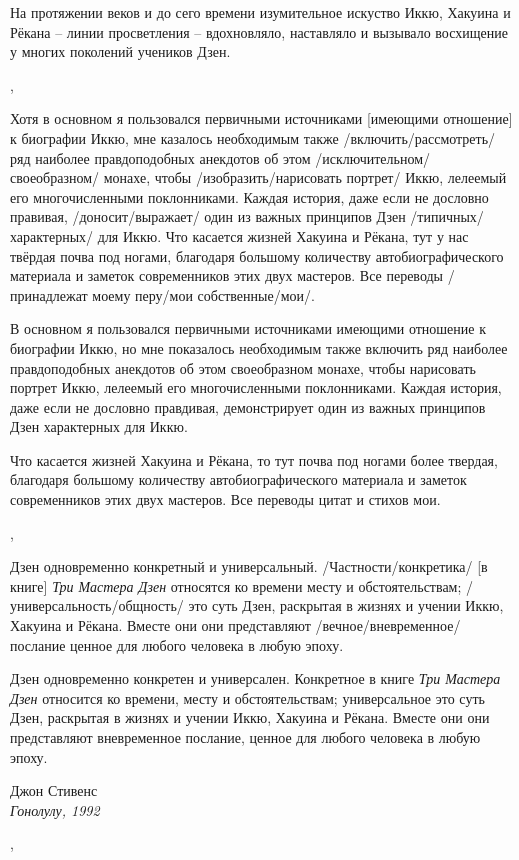 \begin{ver}[1]
На протяжении веков и до сего времени изумительное искуство Иккю,
Хакуина и Рёкана -- линии просветления --
вдохновляло, наставляло и вызывало восхищение у многих поколений
учеников Дзен.
\end{ver}
\sep

\begin{ver}
Хотя в основном я пользовался первичными источниками [имеющими
  отношение] к биографии Иккю, мне казалось
необходимым также /включить/рассмотреть/ ряд наиболее
правдоподобных анекдотов об этом /исключительном/своеобразном/ монахе,
чтобы /изобразить/нарисовать портрет/ Иккю, лелеемый его
многочисленными поклонниками.   
Каждая история, даже если не дословно правивая,  /доносит/выражает/
один из важных принципов Дзен /типичных/характерных/ для Иккю.
Что касается жизней Хакуина и Рёкана, тут у нас твёрдая почва под
ногами, благодаря большому количеству автобиографического материала и
заметок современников этих двух мастеров. Все переводы
/принадлежат моему перу/мои собственные/мои/.
\end{ver}

\begin{ver}[1]
В основном я пользовался первичными источниками имеющими
  отношение к биографии Иккю, но мне показалось
необходимым также включить ряд наиболее
правдоподобных анекдотов об этом своеобразном монахе,
чтобы нарисовать портрет Иккю, лелеемый его
многочисленными поклонниками.   
Каждая история, даже если не дословно правдивая, демонстрирует
один из важных принципов Дзен характерных для Иккю.

Что касается жизней Хакуина и Рёкана, то тут почва под ногами более
твердая, благодаря большому количеству автобиографического материала и
заметок современников этих двух мастеров. Все переводы цитат и
стихов мои.
\end{ver}
\sep

\begin{ver}
Дзен одновременно конкретный и универсальный. /Частности/конкретика/
[в книге] {\em Три Мастера Дзен} относятся ко времени месту и
обстоятельствам; /универсальность/общность/ это суть Дзен, раскрытая в
жизнях и учении Иккю, Хакуина и Рёкана. Вместе они они представляют
/вечное/вневременное/ послание ценное для любого человека в любую эпоху.
\end{ver}

\begin{ver}[1]
Дзен одновременно конкретен и универсален. Конкретное в книге {\em Три
Мастера Дзен} относится ко времени, месту и обстоятельствам;
универсальное это суть Дзен, раскрытая в жизнях и учении Иккю,
Хакуина и Рёкана. Вместе они они представляют вневременное послание,
ценное для любого человека в любую эпоху.
\end{ver}

\hfill\parbox{30mm}{Джон Стивенс\\
                    \em Гонолулу, 1992}
\sep
